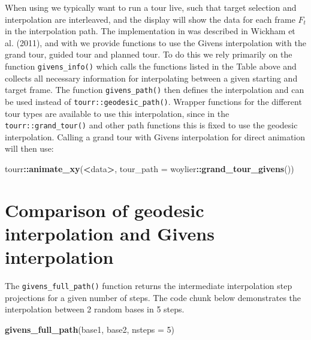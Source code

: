 \documentclass[
]{article}
\newenvironment{Shaded}{\begin{snugshade}}{\end{snugshade}}
\newcommand{\AttributeTok}[1]{\textcolor[rgb]{0.13,0.29,0.53}{#1}}
\newcommand{\DecValTok}[1]{\textcolor[rgb]{0.00,0.00,0.81}{#1}}
\newcommand{\FunctionTok}[1]{\textcolor[rgb]{0.13,0.29,0.53}{\textbf{#1}}}
\newcommand{\NormalTok}[1]{#1}
\newcommand{\SpecialCharTok}[1]{\textcolor[rgb]{0.81,0.36,0.00}{\textbf{#1}}}
\begin{document}
When using  we typically want to run a tour live, such
that target selection and interpolation are interleaved, and the display
will show the data for each frame \(F_t\) in the interpolation path. The
implementation in  was described in Wickham et al.
(2011), and with  we provide functions to use the
Givens interpolation with the grand tour, guided tour and planned tour.
To do this we rely primarily on the function \texttt{givens\_info()}
which calls the functions listed in the Table above and collects all
necessary information for interpolating between a given starting and
target frame. The function \texttt{givens\_path()} then defines the
interpolation and can be used instead of
\texttt{tourr::geodesic\_path()}. Wrapper functions for the different
tour types are available to use this interpolation, since in the
\texttt{tourr::grand\_tour()} and other path functions this is fixed to
use the geodesic interpolation. Calling a grand tour with Givens
interpolation for direct animation will then use:

\begin{Shaded}
\begin{Highlighting}[]
\NormalTok{tourr}\SpecialCharTok{::}\FunctionTok{animate\_xy}\NormalTok{(}\SpecialCharTok{\textless{}}\NormalTok{data}\SpecialCharTok{\textgreater{}}\NormalTok{, }\AttributeTok{tour\_path =}\NormalTok{ woylier}\SpecialCharTok{::}\FunctionTok{grand\_tour\_givens}\NormalTok{())}
\end{Highlighting}
\end{Shaded}

\hypertarget{comparison-of-geodesic-interpolation-and-givens-interpolation}{%
\section{Comparison of geodesic interpolation and Givens
interpolation}\label{comparison-of-geodesic-interpolation-and-givens-interpolation}}

The \texttt{givens\_full\_path()} function returns the intermediate
interpolation step projections for a given number of steps. The code
chunk below demonstrates the interpolation between 2 random bases in 5
steps.

\begin{Shaded}
\begin{Highlighting}[]
\FunctionTok{givens\_full\_path}\NormalTok{(base1, base2, }\AttributeTok{nsteps =} \DecValTok{5}\NormalTok{)}
\end{Highlighting}
\end{Shaded}
\end{document}
